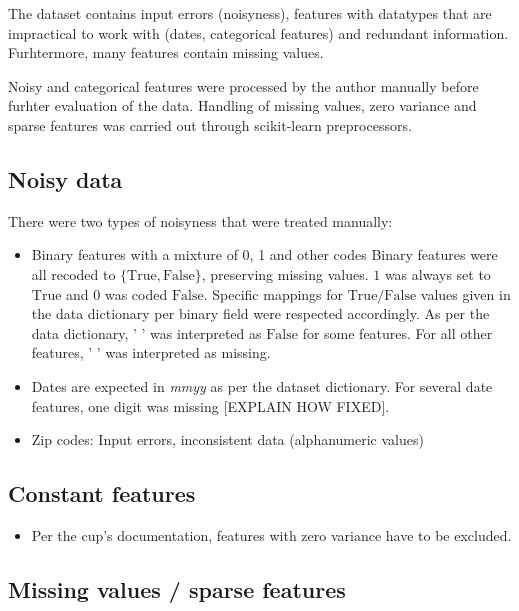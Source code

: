 \documentclass[
  11pt,
  a4paper,
  DIV=12,captions=tableheading,oneside]{scrbook}
\providecommand{\tightlist}{%
  \setlength{\itemsep}{0pt}\setlength{\parskip}{0pt}}
\providecommand{\tightlist}{%
  \setlength{\itemsep}{0pt}\setlength{\parskip}{0pt}}
\begin{document}
The dataset contains input errors (noisyness), features with datatypes that are impractical to work with (dates, categorical features) and redundant information. Furhtermore, many features contain missing values.

Noisy and categorical features were processed by the author manually before furhter evaluation of the data.
Handling of missing values, zero variance and sparse features was carried out through scikit-learn preprocessors.

\hypertarget{noisy-data}{%
\subsection{Noisy data}\label{noisy-data}}

There were two types of noisyness that were treated manually:

\begin{itemize}
\item
  Binary features with a mixture of 0, 1 and other codes
  Binary features were all recoded to \(\{\text{True},\text{False}\}\), preserving missing values. \(1\) was always set to \(\text{True}\) and \(0\) was coded \(\text{False}\). Specific mappings for \(\text{True} / \text{False}\) values given in the data dictionary per binary field were respected accordingly. As per the data dictionary, \(\text{' '}\) was interpreted as \(\text{False}\) for some features. For all other features, \(\text{' '}\) was interpreted as missing.
\item
  Dates are expected in \emph{mmyy} as per the dataset dictionary. For several date features, one digit was missing {[}EXPLAIN HOW FIXED{]}.
\item
  Zip codes: Input errors, inconsistent data (alphanumeric values)
\end{itemize}

\hypertarget{constant-features}{%
\subsection{Constant features}\label{constant-features}}

\begin{itemize}
\tightlist
\item
  Per the cup's documentation, features with zero variance have to be excluded.
\end{itemize}

\hypertarget{missing-values-sparse-features}{%
\subsection{Missing values / sparse features}\label{missing-values-sparse-features}}
\end{document}
